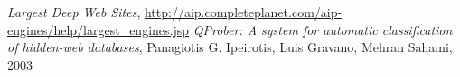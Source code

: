 \documentclass[11pt]{article}
\begin{document}
\begin{thebibliography}{50}
 \textit{Largest Deep Web Sites}, \url{http://aip.completeplanet.com/aip-engines/help/largest_engines.jsp}
 \textit{QProber: A system for automatic classification of hidden-web databases}, Panagiotis G. Ipeirotis, Luis Gravano, Mehran Sahami, 2003
\end{thebibliography}
\end{document}
